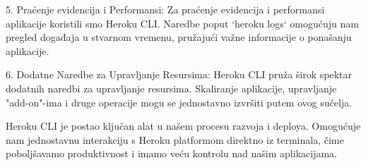 5. Praćenje evidencija i Performansi:
    Za praćenje evidencija i performansi aplikacije koristili smo Heroku CLI. Naredbe poput `heroku logs` omogućuju nam pregled događaja u stvarnom vremenu, pružajući važne informacije o ponašanju aplikacije.

6. Dodatne Naredbe za Upravljanje Resursima:
    Heroku CLI pruža širok spektar dodatnih naredbi za upravljanje resursima. Skaliranje aplikacije, upravljanje "add-on"-ima i druge operacije mogu se jednostavno izvršiti putem ovog sučelja.

Heroku CLI je postao ključan alat u našem procesu razvoja i deploya. Omogućuje nam jednostavnu interakciju s Heroku platformom direktno iz terminala, čime poboljšavamo produktivnost i imamo veću kontrolu nad našim aplikacijama. 

